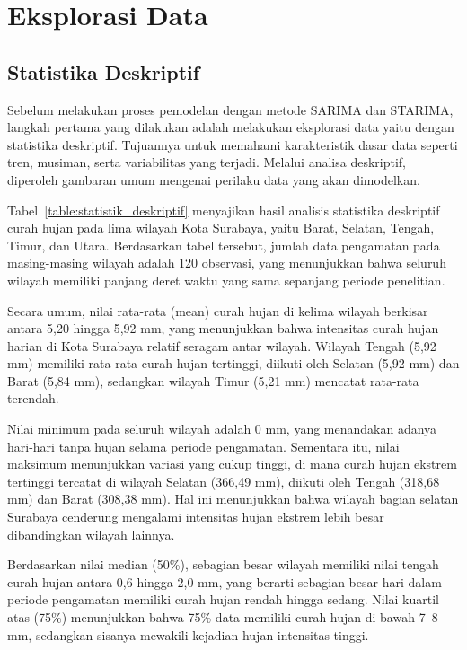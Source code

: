 \section{Eksplorasi Data}
\subsection{Statistika Deskriptif}
Sebelum melakukan proses pemodelan dengan metode SARIMA dan STARIMA, langkah pertama yang dilakukan adalah melakukan eksplorasi data yaitu dengan statistika deskriptif. Tujuannya untuk memahami karakteristik dasar data seperti tren, musiman, serta variabilitas yang terjadi. Melalui analisa deskriptif, diperoleh gambaran umum mengenai perilaku data yang akan dimodelkan.


Tabel~\ref{table:statistik_deskriptif} menyajikan hasil analisis statistika deskriptif curah hujan pada lima wilayah Kota Surabaya, yaitu Barat, Selatan, Tengah, Timur, dan Utara. Berdasarkan tabel tersebut, jumlah data pengamatan pada masing-masing wilayah adalah 120 observasi, yang menunjukkan bahwa seluruh wilayah memiliki panjang deret waktu yang sama sepanjang periode penelitian.

Secara umum, nilai rata-rata (mean) curah hujan di kelima wilayah berkisar antara 5,20 hingga 5,92 mm, yang menunjukkan bahwa intensitas curah hujan harian di Kota Surabaya relatif seragam antar wilayah. Wilayah Tengah (5,92 mm) memiliki rata-rata curah hujan tertinggi, diikuti oleh Selatan (5,92 mm) dan Barat (5,84 mm), sedangkan wilayah Timur (5,21 mm) mencatat rata-rata terendah.

Nilai minimum pada seluruh wilayah adalah 0 mm, yang menandakan adanya hari-hari tanpa hujan selama periode pengamatan. Sementara itu, nilai maksimum menunjukkan variasi yang cukup tinggi, di mana curah hujan ekstrem tertinggi tercatat di wilayah Selatan (366,49 mm), diikuti oleh Tengah (318,68 mm) dan Barat (308,38 mm). Hal ini menunjukkan bahwa wilayah bagian selatan Surabaya cenderung mengalami intensitas hujan ekstrem lebih besar dibandingkan wilayah lainnya.

Berdasarkan nilai median (50\%), sebagian besar wilayah memiliki nilai tengah curah hujan antara 0,6 hingga 2,0 mm, yang berarti sebagian besar hari dalam periode pengamatan memiliki curah hujan rendah hingga sedang. Nilai kuartil atas (75\%) menunjukkan bahwa 75\% data memiliki curah hujan di bawah 7–8 mm, sedangkan sisanya mewakili kejadian hujan intensitas tinggi.

